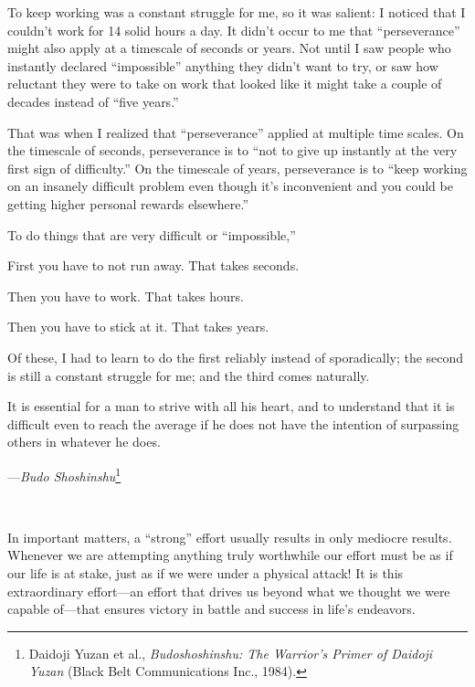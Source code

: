 {
 To keep working was a constant struggle for me, so it was salient:
I noticed that I couldn't work for 14 solid hours a
day. It didn't occur to me that
``perseverance'' might also apply at
a timescale of seconds or years. Not until I saw people who instantly
declared ``impossible'' anything
they didn't want to try, or saw how reluctant they were
to take on work that looked like it might take a couple of decades
instead of ``five years.''}

{
 That was when I realized that
``perseverance'' applied at multiple
time scales. On the timescale of seconds, perseverance is to
``not to give up instantly at the very first sign of
difficulty.'' On the timescale of years, perseverance
is to ``keep working on an insanely difficult problem
even though it's inconvenient and you could be getting
higher personal rewards elsewhere.''}

{
 To do things that are very difficult or
``impossible,''}

{
 First you have to not run away. That takes seconds.}

{
 Then you have to work. That takes hours.}

{
 Then you have to stick at it. That takes years.}

{
 Of these, I had to learn to do the first reliably instead of
sporadically; the second is still a constant struggle for me; and the
third comes naturally.}

\myendsectiontext


{
 It is essential for a man to strive with all his heart, and to
understand that it is difficult even to reach the average if he does
not have the intention of surpassing others in whatever he does.}

{\raggedleft
 {}---\textit{Budo Shoshinshu}\footnote{Daidoji Yuzan et al., \textit{Budoshoshinshu: The
Warrior's Primer of Daidoji Yuzan} (Black Belt
Communications Inc., 1984).}
\par}


\bigskip

{
 ~}

{
 In important matters, a
``strong'' effort usually results in
only mediocre results. Whenever we are attempting anything truly
worthwhile our effort must be as if our life is at stake, just as if we
were under a physical attack! It is this extraordinary effort---an
effort that drives us beyond what we thought we were capable of---that
ensures victory in battle and success in life's
endeavors.}

